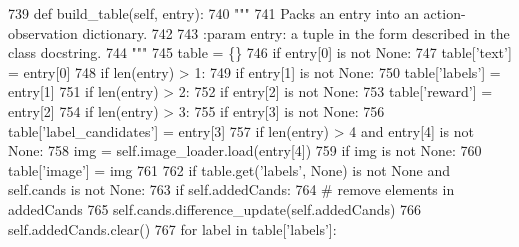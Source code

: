 \begin{DoxyCode}
739     \textcolor{keyword}{def }build\_table(self, entry):
740         \textcolor{stringliteral}{"""}
741 \textcolor{stringliteral}{        Packs an entry into an action-observation dictionary.}
742 \textcolor{stringliteral}{}
743 \textcolor{stringliteral}{        :param entry: a tuple in the form described in the class docstring.}
744 \textcolor{stringliteral}{        """}
745         table = \{\}
746         \textcolor{keywordflow}{if} entry[0] \textcolor{keywordflow}{is} \textcolor{keywordflow}{not} \textcolor{keywordtype}{None}:
747             table[\textcolor{stringliteral}{'text'}] = entry[0]
748         \textcolor{keywordflow}{if} len(entry) > 1:
749             \textcolor{keywordflow}{if} entry[1] \textcolor{keywordflow}{is} \textcolor{keywordflow}{not} \textcolor{keywordtype}{None}:
750                 table[\textcolor{stringliteral}{'labels'}] = entry[1]
751         \textcolor{keywordflow}{if} len(entry) > 2:
752             \textcolor{keywordflow}{if} entry[2] \textcolor{keywordflow}{is} \textcolor{keywordflow}{not} \textcolor{keywordtype}{None}:
753                 table[\textcolor{stringliteral}{'reward'}] = entry[2]
754         \textcolor{keywordflow}{if} len(entry) > 3:
755             \textcolor{keywordflow}{if} entry[3] \textcolor{keywordflow}{is} \textcolor{keywordflow}{not} \textcolor{keywordtype}{None}:
756                 table[\textcolor{stringliteral}{'label\_candidates'}] = entry[3]
757         \textcolor{keywordflow}{if} len(entry) > 4 \textcolor{keywordflow}{and} entry[4] \textcolor{keywordflow}{is} \textcolor{keywordflow}{not} \textcolor{keywordtype}{None}:
758             img = self.image\_loader.load(entry[4])
759             \textcolor{keywordflow}{if} img \textcolor{keywordflow}{is} \textcolor{keywordflow}{not} \textcolor{keywordtype}{None}:
760                 table[\textcolor{stringliteral}{'image'}] = img
761 
762         \textcolor{keywordflow}{if} table.get(\textcolor{stringliteral}{'labels'}, \textcolor{keywordtype}{None}) \textcolor{keywordflow}{is} \textcolor{keywordflow}{not} \textcolor{keywordtype}{None} \textcolor{keywordflow}{and} self.cands \textcolor{keywordflow}{is} \textcolor{keywordflow}{not} \textcolor{keywordtype}{None}:
763             \textcolor{keywordflow}{if} self.addedCands:
764                 \textcolor{comment}{# remove elements in addedCands}
765                 self.cands.difference\_update(self.addedCands)
766                 self.addedCands.clear()
767             \textcolor{keywordflow}{for} label \textcolor{keywordflow}{in} table[\textcolor{stringliteral}{'labels'}]:

\end{DoxyCode}
